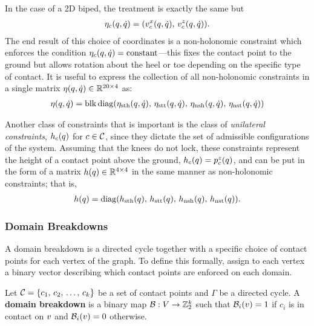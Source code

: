 %
In the case of a 2D biped, the treatment is exactly the same but
\begin{align*}
  \eta_{c}(q, \dot{q}) = (v_{c}^{x}(q, \dot{q}), \, v_{c}^{z}(q, \dot{q})).
\end{align*}
%
The end result of this choice of coordinates is a non-holonomic constraint which
enforces the condition $\eta_{c}(q, \dot{q}) = \mathrm{constant}$---this fixes the
contact point to the ground but allows rotation about the heel or toe depending
on the specific type of contact.
%
It is useful to express the collection of all non-holonomic constraints in a
single matrix $\eta(q, \dot{q}) \in \mathbb{R}^{20 \times 4}$ as:
%
\begin{align*}
  \eta(q, \dot{q}) = \operatorname*{blk\,diag}(\eta_{\mathrm{sth}}(q, \dot{q}), \, \eta_{\mathrm{stt}}(q, \dot{q}), \,
  \eta_{\mathrm{nsh}}(q, \dot{q}), \, \eta_{\mathrm{nst}}(q, \dot{q}))
\end{align*}

Another class of constraints that is important is the class of {\em unilateral
  constraints}, $h_{c}(q)$ for $c \in \mathcal{C}$, since they dictate the set of
admissible configurations of the system.
%
Assuming that the knees do not lock, these constraints represent the height of a
contact point above the ground, $h_{c}(q) = p_{c}^{z}(q)$, and can be put
in the form of a matrix $h(q) \in \mathbb{R}^{4 \times 4}$ in the same manner as
non-holonomic constraints;
%
that is,
\begin{align*}
  h(q) = \operatorname*{diag}(h_{\mathrm{sth}}(q), \, h_{\mathrm{stt}}(q), \,  h_{\mathrm{nsh}}(q), \,
  h_{\mathrm{nst}}(q)).
\end{align*}


\subsubsection{Domain Breakdowns}

A domain breakdown is a directed cycle together with a specific choice of
contact points for each vertex of the graph.
%
To define this formally, assign to each vertex a binary vector describing which
contact points are enforced on each domain.

\begin{definition}
  \label{def:domainbreakdown}
  Let $\mathcal{C} = \{c_{1}, \, c_{2}, \, \ldots, \, c_{k}\}$ be a set of contact points
  and $\Gamma$ be a directed cycle.
  A {\bf domain breakdown} is a binary map $\mathcal{B} : V \to \mathbb{Z}_{2}^{k}$ such that
  $\mathcal{B}_{i}(v) = 1$ if $c_{i}$ is in contact on $v$ and $\mathcal{B}_{i}(v) = 0$
  otherwise.
\end{definition}

